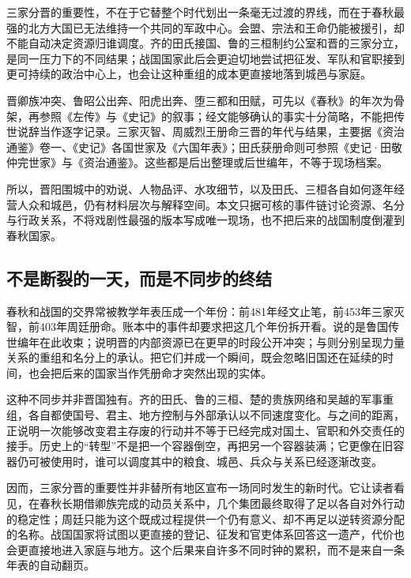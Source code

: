 \begin{turningpoint}[三家分晋为什么是春秋和战国之间的门槛]
三家分晋的重要性，不在于它替整个时代划出一条毫无过渡的界线，而在于春秋最强的北方大国已无法维持一个共同的军政中心。会盟、宗法和王命仍能被援引，却不能自动决定资源归谁调度。齐的田氏接国、鲁的三桓制约公室和晋的三家分立，是同一压力下的不同结果；战国国家此后会更迫切地尝试把征发、军队和官职接到更可持续的政治中心上，也会让这种重组的成本更直接地落到城邑与家庭。
\end{turningpoint}

\begin{sourcenote}[晋阳、册命与家门上升的材料边界]
晋卿族冲突、鲁昭公出奔、阳虎出奔、堕三都和田赋，可先以《春秋》的年次为骨架，再参照《左传》与《史记》的叙事；经文能够确认的事实十分简略，不能把传世说辞当作逐字记录。三家灭智、周威烈王册命三晋的年代与结果，主要据《资治通鉴》卷一、《史记》各国世家及《六国年表》；田氏获册命则可参照《史记·田敬仲完世家》与《资治通鉴》。这些都是后出整理或后世编年，不等于现场档案。

所以，晋阳围城中的劝说、人物品评、水攻细节，以及田氏、三桓各自如何逐年经营人众和城邑，仍有材料层次与解释空间。本文只据可核的事件链讨论资源、名分与行政关系，不将戏剧性最强的版本写成唯一现场，也不把后来的战国制度倒灌到春秋国家。
\end{sourcenote}

\subsection{不是断裂的一天，而是不同步的终结}

春秋和战国的交界常被教学年表压成一个年份：前481年经文止笔，前453年三家灭智，前403年周廷册命。账本中的事件却要求把这几个年份拆开看。说的是鲁国传世编年在此收束；说明晋的内部资源已在更早的时段公开冲突；与则分别呈现力量关系的重组和名分上的承认。把它们并成一个瞬间，既会忽略旧国还在延续的时间，也会把后来的国家当作凭册命才突然出现的实体。

这种不同步并非晋国独有。齐的田氏、鲁的三桓、楚的贵族网络和吴越的军事重组，各自都使国号、君主、地方控制与外部承认以不同速度变化。与之间的距离，正说明一次能够改变君主存废的行动并不等于已经完成对国土、官职和外交责任的接手。历史上的“转型”不是把一个容器倒空，再把另一个容器装满；它更像在旧容器仍可被使用时，谁可以调度其中的粮食、城邑、兵众与关系已经逐渐改变。

因而，三家分晋的重要性并非替所有地区宣布一场同时发生的新时代。它让读者看见，在春秋长期借卿族完成的动员关系中，几个集团最终取得了足以各自对外行动的稳定性；周廷只能为这个既成过程提供一个仍有意义、却不再足以逆转资源分配的名称。战国国家将试图以更直接的登记、征发和官吏体系回答这一遗产，代价也会更直接地进入家庭与地方。这个后果来自许多不同时钟的累积，而不是来自一条年表的自动翻页。
